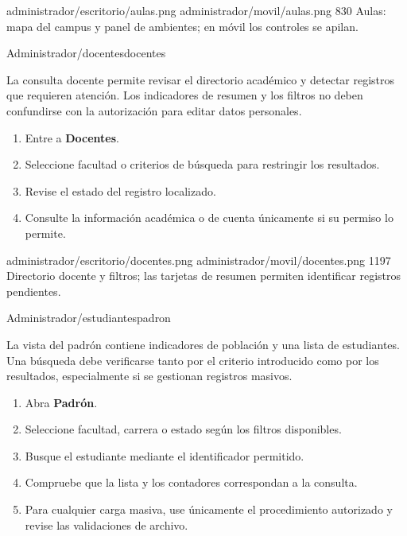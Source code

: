 \documentclass[11pt,a4paper]{article}
\begin{document}

\Pantallas
{administrador/escritorio/aulas.png}
{administrador/movil/aulas.png}
{830}
{Aulas: mapa del campus y panel de ambientes;
en móvil los controles se apilan.}


{Administrador}{/docentes}{docentes}

La consulta docente permite revisar el directorio académico
y detectar registros que requieren atención. Los indicadores
de resumen y los filtros no deben confundirse con la
autorización para editar datos personales.

\pasos
\begin{enumerate}
\item Entre a \textbf{Docentes}.
\item Seleccione facultad o criterios de búsqueda
para restringir los resultados.
\item Revise el estado del registro localizado.
\item Consulte la información académica o de cuenta
únicamente si su permiso lo permite.
\end{enumerate}


\Pantallas
{administrador/escritorio/docentes.png}
{administrador/movil/docentes.png}
{1197}
{Directorio docente y filtros; las tarjetas de resumen
permiten identificar registros pendientes.}


{Administrador}{/estudiantes}{padron}

La vista del padrón contiene indicadores de población
y una lista de estudiantes. Una búsqueda debe verificarse
tanto por el criterio introducido como por los resultados,
especialmente si se gestionan registros masivos.

\pasos
\begin{enumerate}
\item Abra \textbf{Padrón}.
\item Seleccione facultad, carrera o estado según
los filtros disponibles.
\item Busque el estudiante mediante el identificador permitido.
\item Compruebe que la lista y los contadores correspondan
a la consulta.
\item Para cualquier carga masiva, use únicamente
el procedimiento autorizado y revise las validaciones
de archivo.
\end{enumerate}
\end{document}
